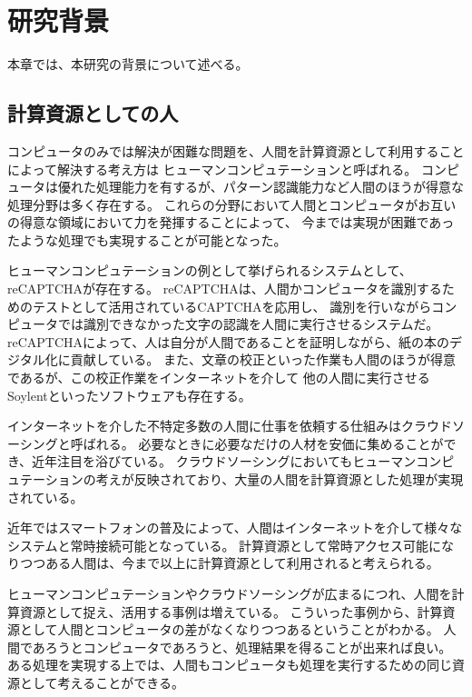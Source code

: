 \chapter{研究背景}\label{chap:background}

本章では、本研究の背景について述べる。

\section{計算資源としての人}\label{ux8a08ux7b97ux8cc7ux6e90ux3068ux3057ux3066ux306eux4eba}

コンピュータのみでは解決が困難な問題を、人間を計算資源として利用することによって解決する考え方は
ヒューマンコンピュテーション\cite{humancomputation}と呼ばれる。
コンピュータは優れた処理能力を有するが、パターン認識能力など人間のほうが得意な処理分野は多く存在する。
これらの分野において人間とコンピュータがお互いの得意な領域において力を発揮することによって、
今までは実現が困難であったような処理でも実現することが可能となった。

ヒューマンコンピュテーションの例として挙げられるシステムとして、reCAPTCHA\cite{recaptcha}が存在する。
reCAPTCHAは、人間かコンピュータを識別するためのテストとして活用されているCAPTCHA\cite{captcha}を応用し、
識別を行いながらコンピュータでは識別できなかった文字の認識を人間に実行させるシステムだ。
reCAPTCHAによって、人は自分が人間であることを証明しながら、紙の本のデジタル化に貢献している。
また、文章の校正といった作業も人間のほうが得意であるが、この校正作業をインターネットを介して
他の人間に実行させるSoylent\cite{soylent}といったソフトウェアも存在する。

インターネットを介した不特定多数の人間に仕事を依頼する仕組みはクラウドソーシング\cite{riseofcrowdsourcing}と呼ばれる。
必要なときに必要なだけの人材を安価に集めることができ、近年注目を浴びている。
クラウドソーシングにおいてもヒューマンコンピュテーションの考えが反映されており、大量の人間を計算資源とした処理が実現されている。

近年ではスマートフォンの普及によって、人間はインターネットを介して様々なシステムと常時接続可能となっている。
計算資源として常時アクセス可能になりつつある人間は、今まで以上に計算資源として利用されると考えられる。

ヒューマンコンピュテーションやクラウドソーシングが広まるにつれ、人間を計算資源として捉え、活用する事例は増えている。
こういった事例から、計算資源として人間とコンピュータの差がなくなりつつあるということがわかる。
人間であろうとコンピュータであろうと、処理結果を得ることが出来れば良い。
ある処理を実現する上では、人間もコンピュータも処理を実行するための同じ資源として考えることができる。

